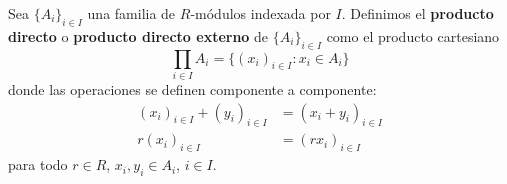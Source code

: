 %
%

\begin{definicion}
	Sea \(\{A_{i}\}_{i \in I}\) una familia de \(R\)-módulos indexada por \(I\).
	Definimos el \textbf{producto directo} o \textbf{producto directo externo} de
	\(\{A_{i}\}_{i \in I}\) como el producto cartesiano
	\[
		\prod_{i \in I}A_{i} = \{(x_{i})_{i \in I}: x_{i} \in A_{i} \}
	\]
	donde las operaciones se definen componente a componente:
	\begin{align*}
		(x_{i})_{i \in I}+ (y_{i})_{i \in I} & = (x_{i}+y_{i})_{i \in I} \\
		r(x_{i})_{i \in I}                   & = (rx_{i})_{i \in I}
	\end{align*}
	para todo \(r \in R\), \(x_{i},y_{i} \in A_{i}\), \(i \in I\).
\end{definicion}

